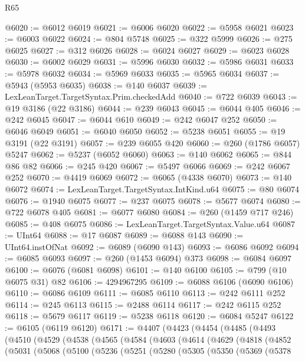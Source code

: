 \begin{lexlean}{R65}
\begin{coremodule}
{@6020 := @6012 @6019
@6021 := @6006 @6020
@6022 := @5958 @6021
@6023 := @6003 @6022
@6024 := @804 @5748
@6025 := @322 @5999
@6026 := @275 @6025
@6027 := @312 @6026
@6028 := @6024 @6027
@6029 := @6023 @6028
@6030 := @6002 @6029
@6031 := @5996 @6030
@6032 := @5986 @6031
@6033 := @5978 @6032
@6034 := @5969 @6033
@6035 := @5965 @6034
@6037 := @5943 (@5953 @6035)
@6038 := @140 @6037
@6039 := LexLeanTarget.TargetSyntax.Prim.checkedAdd
@6040 := @722 @6039
@6043 := @19 @3186 (@22 @3186)
@6044 := @239 @6043
@6045 := @6044 @405
@6046 := @242 @6045
@6047 := @6044 @610
@6049 := @242 @6047 @252
@6050 := @6046 @6049
@6051 := @6040 @6050
@6052 := @5238 @6051
@6055 := @19 @3191 (@22 @3191)
@6057 := @239 @6055 @420
@6060 := @260 (@1786 @6057) @5247
@6062 := @5237 (@6052 @6060)
@6063 := @140 @6062
@6065 := @844 @86 @82
@6066 := @245 @420
@6067 := @5497 @6066
@6069 := @242 @6067 @252
@6070 := @4419 @6069
@6072 := @6065 (@4338 @6070)
@6073 := @140 @6072
@6074 := LexLeanTarget.TargetSyntax.IntKind.u64
@6075 := @80 @6074
@6076 := @1940 @6075
@6077 := @237 @6075
@6078 := @5677 @6074
@6080 := @722 @6078 @405
@6081 := @6077 @6080
@6084 := @260 (@1459 @717 @246)
@6085 := @408 @6075
@6086 := LexLeanTarget.TargetSyntax.Value.u64
@6087 := UInt64
@6088 := @17 @6087
@6089 := @6088 @143
@6090 := UInt64.instOfNat
@6092 := @6089 (@6090 @143)
@6093 := @6086 @6092
@6094 := @6085 @6093
@6097 := @260 (@1453 @6094) @373
@6098 := @6084 @6097
@6100 := @6076 (@6081 @6098)
@6101 := @140 @6100
@6105 := @799 (@10 @6075 @31) @82
@6106 := 4294967295
@6109 := @6088 @6106 (@6090 @6106)
@6110 := @6086 @6109
@6111 := @6085 @6110
@6113 := @242 @6111 @252
@6114 := @245 @6113
@6115 := @2488 @6114
@6117 := @242 @6115 @252
@6118 := @5679 @6117
@6119 := @5238 @6118
@6120 := @6084 @5247
@6122 := @6105 (@6119 @6120)
@6171 := @4407
    (@4423
      (@4454
        (@4485
          (@4493
            (@4510
              (@4529
                (@4538
                  (@4565
                    (@4584
                      (@4603
                        (@4614
                          (@4629
                            (@4818
                              (@4852
                                (@5031
                                  (@5068
                                    (@5100
                                      (@5236
                                        (@5251
                                          (@5280
                                            (@5305
                                              (@5350
                                                (@5369
                                                  (@5378
}
\end{coremodule}
\end{lexlean}
